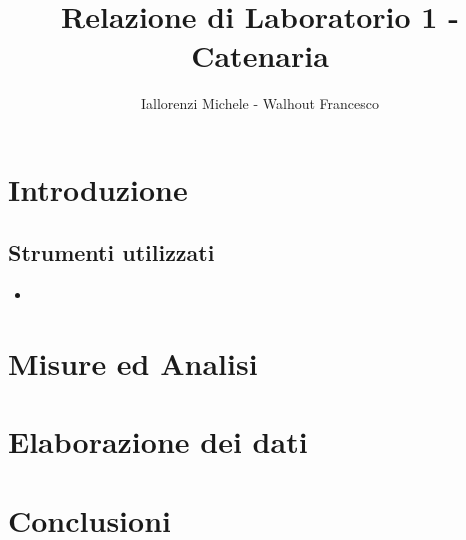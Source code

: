 \documentclass{article}
\title{Relazione di Laboratorio 1 - Catenaria}
\author{Iallorenzi Michele - Walhout Francesco}
\begin{document}
    \maketitle

    \section{Introduzione}
    \subsection{Strumenti utilizzati}
    \begin{itemize}
        \item 
    \end{itemize}
    \section{Misure ed Analisi}
    \section{Elaborazione dei dati}
    \section{Conclusioni}
\end{document}
